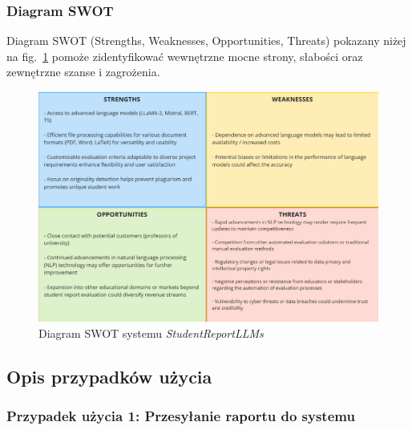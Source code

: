 \documentclass[a4paper, 12pt]{article}
\begin{document}
\subsubsection*{Diagram SWOT}
Diagram SWOT (Strengths, Weaknesses, Opportunities, Threats) pokazany niżej na fig.~\ref{fig:swot} pomoże zidentyfikować wewnętrzne mocne strony, słabości oraz zewnętrzne szanse i zagrożenia.

\begin{figure}[H]
    \centering
    \includegraphics[width=\textwidth]{img/swot}
    \caption{Diagram SWOT systemu \textit{StudentReportLLMs}}
    \label{fig:swot}
\end{figure}

\subsection{Opis przypadków użycia}

\subsubsection*{Przypadek użycia 1: Przesyłanie raportu do systemu}
\end{document}
